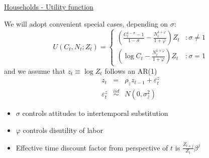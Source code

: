 

\begin{frame}[label=utfn]{\hyperlink{wageresponse}{Households - Utility function}}

We will adopt convenient special cases, depending on $\sigma$:
\[U\left(C_{t}, N_{t}; Z_{t} \right)= \left\{
  \begin{array}{lr}
   \left( \frac{C_{t}^{1-\sigma} - 1}{1-\sigma} - \frac{N_{t}^{1+\varphi}}{1+\varphi} \right)Z_{t}  & : \sigma \neq 1\\
   \left( \log C_{t} -  \frac{N_{t}^{1+\varphi}}{1+\varphi} \right)Z_{t} &: \sigma=1
  \end{array}
\right.
\]
and we assume that $z_{t} \equiv \log{Z_{t}}$ follows an AR(1)
\begin{eqnarray*}
z_{t} 				&=& 					\rho_{z} z_{t-1} + \varepsilon_{t}^{z} \\
\varepsilon_{t}^{z}	&\stackrel{iid}{\sim}&	 N\left(0,\sigma_{z}^{2}\right)
\end{eqnarray*}

\begin{itemize}
\item	$\sigma$ controls attitudes to intertemporal substitution
\item	$\varphi$ controls disutility of labor
\item	Effective time discount factor from perspective of $t$ is $\frac{Z_{t+j}}{Z_{t}}\beta^j$
\end{itemize}

\end{frame}



